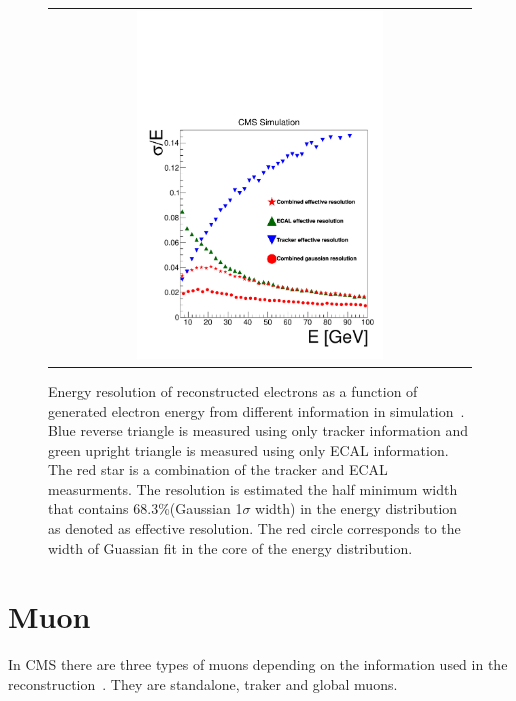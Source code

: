 \begin{figure}[htp] 
\centering 
\begin{tabular}{c} 
\includegraphics[width=0.6\textwidth]{figures/effRMSfinal-3.pdf} 
\end{tabular} 
\caption{Energy resolution of reconstructed electrons as a function 
of generated electron energy from different information 
in simulation~\cite{PAS-HIG-13-002}. 
Blue reverse triangle is measured using only tracker information 
and green upright triangle is measured using only ECAL information. 
The red star is a combination of the tracker and ECAL measurments. 
The resolution is estimated the half minimum width that
contains 68.3\%(Gaussian 1$\sigma$ width) in the energy distribution
as denoted as effective resolution. The red circle corresponds to the 
width of Guassian fit in the core of the energy distribution.
}
\label{fig:ElectronEnergyResMC} 
\end{figure} 

\section{ Muon }
\label{sec:muon_reco}

In CMS there are three types of muons depending on the information used in the 
reconstruction~\cite{cmstdr1}. They are standalone, traker and global muons.   

